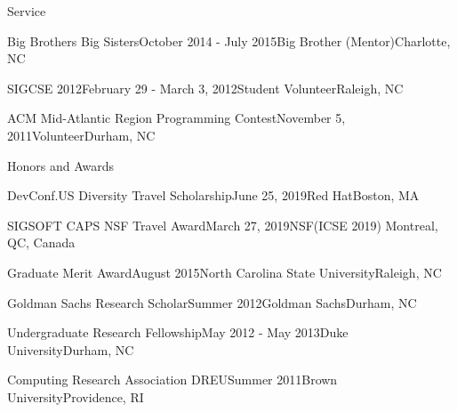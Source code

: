 \documentclass{resume} %
\begin{document}
\begin{rSection}{Service}
\begin{sSubsection}{Big Brothers Big Sisters}{October 2014 - July 2015}{Big Brother (Mentor)}{Charlotte, NC}
\end{sSubsection}
\vspace{-5pt}
\begin{sSubsection}{SIGCSE 2012}{February 29 - March 3, 2012}{Student Volunteer}{Raleigh, NC}
\end{sSubsection}
\vspace{-5pt}
\begin{sSubsection}{ACM Mid-Atlantic Region Programming Contest}{November 5, 2011}{Volunteer}{Durham, NC}
\end{sSubsection}
\vspace{-5pt}
\end{rSection}

\begin{rSection}{Honors and Awards}

\begin{sSubsection}
{DevConf.US Diversity Travel Scholarship}{June 25, 2019}{Red Hat}{Boston, MA}
\end{sSubsection}
\vspace{-5pt}

\begin{sSubsection}
{SIGSOFT CAPS NSF Travel Award}{March 27, 2019}{NSF}{(ICSE 2019) Montreal, QC, Canada}
\end{sSubsection}
\vspace{-5pt}

\begin{sSubsection}
{Graduate Merit Award}{August 2015}{North Carolina State University}{Raleigh, NC}
\end{sSubsection}
\vspace{-5pt}

\begin{sSubsection}
{Goldman Sachs Research Scholar}{Summer 2012}{Goldman Sachs}{Durham, NC}
\end{sSubsection}
\vspace{-5pt}

\begin{sSubsection}
{Undergraduate Research Fellowship}{May 2012 - May 2013}{Duke University}{Durham, NC}
\end{sSubsection}
\vspace{-5pt}

\begin{sSubsection}
{Computing Research Association DREU}{Summer 2011}{Brown University}{Providence, RI}
\end{sSubsection}
\vspace{-5pt}

\end{rSection}
\end{document}
